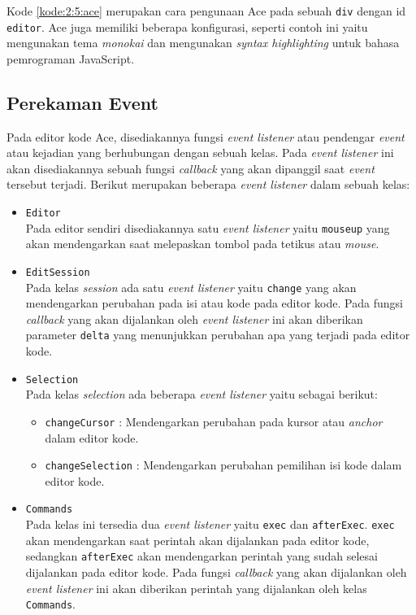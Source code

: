 Kode \ref{kode:2:5:ace} merupakan cara pengunaan Ace pada sebuah \texttt{div} dengan id \texttt{editor}. Ace juga memiliki beberapa konfigurasi, seperti contoh ini yaitu mengunakan tema \textit{monokai} dan mengunakan \textit{syntax highlighting} untuk bahasa pemrograman JavaScript.

\subsection{Perekaman Event}

Pada editor kode Ace, disediakannya fungsi \textit{event listener} atau pendengar \textit{event} atau kejadian yang berhubungan dengan sebuah kelas. Pada \textit{event listener} ini akan disediakannya sebuah fungsi \textit{callback} yang akan dipanggil saat \textit{event} tersebut terjadi. Berikut merupakan beberapa \textit{event listener} dalam sebuah kelas:

\begin{itemize}
	\item \verb|Editor| \\
	      Pada editor sendiri disediakannya satu \textit{event listener} yaitu \verb|mouseup| yang akan mendengarkan saat melepaskan tombol pada tetikus atau \textit{mouse}.

	\item \verb|EditSession| \\
	      Pada kelas \textit{session} ada satu \textit{event listener} yaitu \verb|change| yang akan mendengarkan perubahan pada isi atau kode pada editor kode. Pada fungsi \textit{callback} yang akan dijalankan oleh \textit{event listener} ini akan diberikan parameter \verb|delta| yang menunjukkan perubahan apa yang terjadi pada editor kode.

	\item \verb|Selection| \\
	      Pada kelas \textit{selection} ada beberapa \textit{event listener} yaitu sebagai berikut:

	      \begin{itemize}
		      \item \verb|changeCursor| : Mendengarkan perubahan pada kursor atau \textit{anchor} dalam editor kode.
		      \item \verb|changeSelection| : Mendengarkan perubahan pemilihan isi kode dalam editor kode.
	      \end{itemize}

	\item \verb|Commands| \\
	      Pada kelas ini tersedia dua \textit{event listener} yaitu \verb|exec| dan \verb|afterExec|. \verb|exec| akan mendengarkan saat perintah akan dijalankan pada editor kode, sedangkan \verb|afterExec| akan mendengarkan perintah yang sudah selesai dijalankan pada editor kode. Pada fungsi \textit{callback} yang akan dijalankan oleh \textit{event listener} ini akan diberikan perintah yang dijalankan oleh kelas \verb|Commands|.
\end{itemize}

